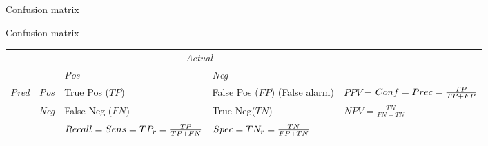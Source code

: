 \documentclass{beamer}
\begin{document}
\begin{frame}{Confusion matrix}

\alert{Confusion matrix} 

\begin{tabular}{cc||p{2.5cm}|p{2.5cm}||p{2.5cm}}
  & & \multicolumn{2}{c}{\emph{Actual}}\\
  & &    \emph{Pos} & \emph{Neg} \\
  \hline\hline
  \multirow{6}{*}{\emph{Pred}}
  &\emph{Pos} & True Pos \newline ($TP$)  &  False Pos \newline ($FP$)  \newline (False alarm) & $PPV=$\newline $Conf= \newline Prec=\frac{TP}{TP+FP}$ \\
  \cline{2-5}
  &\emph{Neg} & False Neg \newline  ($FN$)   &  True Neg\newline ($TN$) & $NPV=\frac{TN}{FN+TN}$\\
  \hline
  &  & $Recall=\newline Sens=\newline TP_r= \frac{TP}{TP+FN}$ & $Spec= \newline TN_r= \frac{TN}{FP+TN} $ & \\
\end{tabular}

\end{frame}

% 
% 
% 
% 
% 
% 
% 
\end{document}
